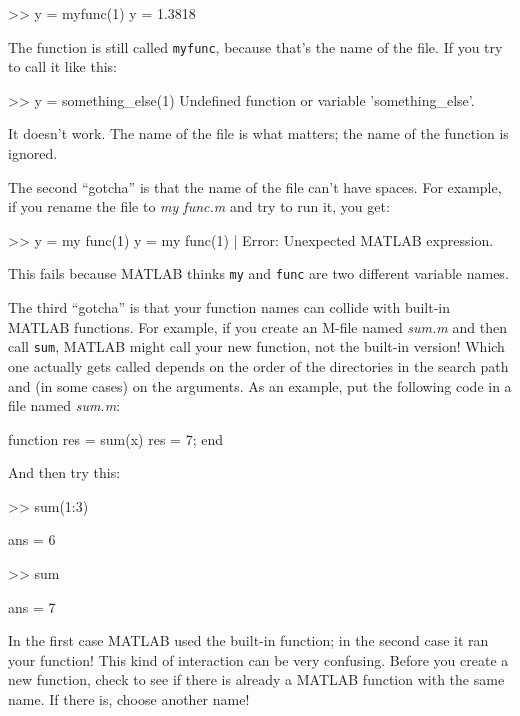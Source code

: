 \begin{code}
>> y = myfunc(1)
y = 1.3818
\end{code}

The function is still called \lstinline{myfunc}, because that's the name of the file.
If you try to call it like this:

\begin{code}
>> y = something_else(1)
Undefined function or variable 'something_else'.
\end{code}

It doesn't work.  The name of the file is what matters; the name of the function is ignored.

The second ``gotcha'' is that the name of the file can't have spaces.
For example, if you rename the file to \emph{my func.m}
and try to run it, you get:

\begin{code}
>> y = my func(1)
 y = my func(1)
        |
Error: Unexpected MATLAB expression.
\end{code}

This fails because MATLAB thinks \lstinline{my} and \lstinline{func} are two different
variable names.

The third ``gotcha'' is that your function names can collide with built-in
MATLAB functions.  For example, if you create an M-file named \emph{sum.m} and then call \lstinline{sum}, MATLAB might call your new
function, not the built-in version!  Which one actually gets called
depends on the order of the directories in the search path and
(in some cases) on the arguments.  As an example, put the following
code in a file named \emph{sum.m}:


\begin{code}
function res = sum(x)
   res = 7;
end
\end{code}

And then try this:

\begin{code}
>> sum(1:3)

ans = 6

>> sum

ans = 7
\end{code}

In the first case MATLAB used the built-in function; in the second
case it ran your function!  This kind of interaction can be very
confusing.  Before you create a new function, check to see if there is
already a MATLAB function with the same name.  If there is, choose
another name!

